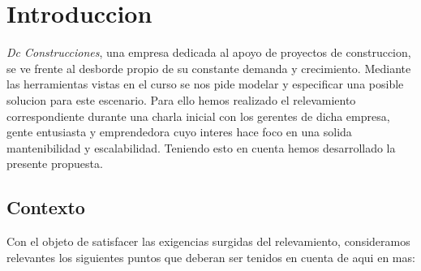 \section{Introduccion}

\textit{Dc Construcciones}, una empresa dedicada al apoyo de proyectos de construccion, se ve frente al desborde propio de su constante demanda y crecimiento. Mediante las herramientas vistas en el curso se nos pide modelar y especificar una posible solucion para este escenario. Para ello hemos realizado el relevamiento correspondiente durante una charla inicial con los gerentes de dicha empresa, gente entusiasta y emprendedora cuyo interes hace foco en una solida mantenibilidad y escalabilidad. Teniendo esto en cuenta hemos desarrollado la presente propuesta.

\subsection{Contexto}

Con el objeto de satisfacer las exigencias surgidas del relevamiento, consideramos relevantes los siguientes puntos que deberan ser tenidos en cuenta de aqui en mas:

